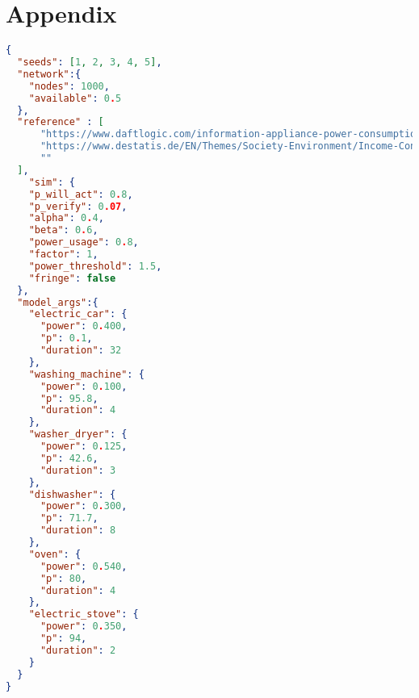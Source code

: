 \chapter{Appendix}

\begin{lstlisting}[language=json,firstnumber=1, 
    caption={Configuration file for scenario 1
    },captionpos=b,label={scenario1config}]
{
  "seeds": [1, 2, 3, 4, 5],
  "network":{
    "nodes": 1000,
    "available": 0.5
  },
  "reference" : [
      "https://www.daftlogic.com/information-appliance-power-consumption.htm",
      "https://www.destatis.de/EN/Themes/Society-Environment/Income-Consumption-Living-Conditions/Equipment-Consumer-Durables/Tables/liste-equipment-households-electrical--household-appliance-others-germany.html#55702",
      ""
  ],
    "sim": {
    "p_will_act": 0.8,
    "p_verify": 0.07,
    "alpha": 0.4,
    "beta": 0.6,
    "power_usage": 0.8,
    "factor": 1,
    "power_threshold": 1.5,
    "fringe": false
  },
  "model_args":{
    "electric_car": {
      "power": 0.400,
      "p": 0.1,
      "duration": 32
    },
    "washing_machine": {
      "power": 0.100,
      "p": 95.8,
      "duration": 4
    },
    "washer_dryer": {
      "power": 0.125,
      "p": 42.6,
      "duration": 3
    },
    "dishwasher": {
      "power": 0.300,
      "p": 71.7,
      "duration": 8
    },
    "oven": {
      "power": 0.540,
      "p": 80,
      "duration": 4
    },
    "electric_stove": {
      "power": 0.350,
      "p": 94,
      "duration": 2
    }
  }
}
\end{lstlisting}